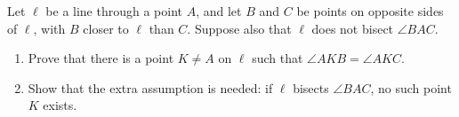 Let $\ell$ be a line through a point $A$, and let $B$ and $C$ be points on opposite sides of $\ell$, with $B$ closer to $\ell$ than $C$. Suppose also that $\ell$ does not bisect $\angle BAC$.
\begin{enumerate}
\item[(a)] Prove that there is a point $K\ne A$ on $\ell$ such that $\angle AKB=\angle AKC$.
\item[(b)] Show that the extra assumption is needed: if $\ell$ bisects $\angle BAC$, no such point $K$ exists.
\end{enumerate}
